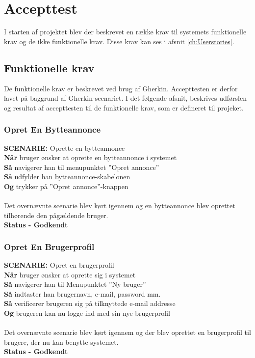 \chapter{Accepttest}\label{ch:Accepttest}
I starten af projektet blev der beskrevet en række krav til systemets funktionelle krav og de ikke funktionelle krav. Disse krav kan ses i afsnit \ref{ch:Userstories}.

\section{Funktionelle krav}
De funktionelle krav er beskrevet ved brug af Gherkin. Accepttesten er derfor lavet på baggrund af Gherkin-scenariet. I det følgende afsnit, beskrives udførslen og resultat af accepttesten til de funktionelle krav, som er defineret til projeket.

\subsection{Opret En Bytteannonce}
{\color{blue}\textbf{SCENARIE:}} Oprette en bytteannonce \\ 
{\color{blue}\textbf{Når}}  bruger ønsker at oprette en bytteannonce i systemet \\
{\color{blue}\textbf{Så}} navigerer han til menupunktet ”Opret annonce” \\
{\color{blue}\textbf{Så}} udfylder han bytteannonce-skabelonen \\
{\color{blue}\textbf{Og}} trykker på ”Opret annonce”-knappen \\ \\
Det overnævnte scenarie blev kørt igennem og en bytteannonce blev oprettet tilhørende den pågældende bruger. \\
\textbf{Status - Godkendt}

\subsection{Opret En Brugerprofil}
{\color{blue}\textbf{SCENARIE:}} Opret en brugerprofil \\
{\color{blue}\textbf{Når}} bruger ønsker at oprette sig i systemet \\
{\color{blue}\textbf{Så}} navigerer han til Menupunktet ”Ny bruger” \\
{\color{blue}\textbf{Så}} indtaster han brugernavn, e-mail, password mm.\\
{\color{blue}\textbf{Så}} verificerer brugeren sig på tilknyttede e-mail addresse\\
{\color{blue}\textbf{Og}} brugeren kan nu logge ind med sin nye brugerprofil \\ \\
Det overnævnte scenarie blev kørt igennem og der blev oprettet en brugerprofil til brugere, der nu kan benytte systemet.  \\
\textbf{Status - Godkendt}

